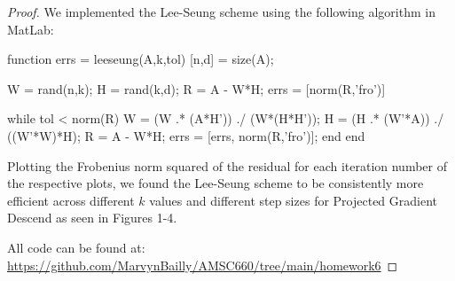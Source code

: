 \documentclass[12pt]{report}
\begin{document}
\begin{problem}
\begin{proof}
\noindent
We implemented the Lee-Seung scheme using the following algorithm in MatLab:
\begin{python}
function errs = leeseung(A,k,tol)
    [n,d] = size(A);
    
    W = rand(n,k);
    H = rand(k,d);
    R = A - W*H;
    errs = [norm(R,'fro')]

    while tol < norm(R)
        W = (W .* (A*H')) ./ (W*(H*H'));
        H = (H .* (W'*A)) ./ ((W'*W)*H);
        R = A - W*H;
        errs = [errs, norm(R,'fro')];
    end
end
\end{python}

Plotting the Frobenius norm squared of the residual for each iteration number of the respective plots, we found the Lee-Seung scheme to be consistently more efficient across different $k$ values and different step sizes for Projected Gradient Descend as seen in Figures 1-4.

\noindent All code can be found at: \url{https://github.com/MarvynBailly/AMSC660/tree/main/homework6}


\end{proof}
\end{problem}
\end{document}
